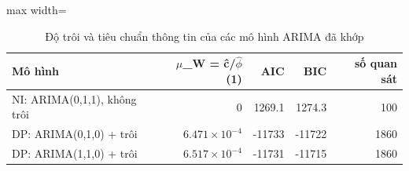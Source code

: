 \begin{table}[H]
\centering\small
\caption{Độ trôi và tiêu chuẩn thông tin của các mô hình ARIMA đã khớp}\label{tab:tab_b12_05_fit_stats}
\begin{adjustbox}{max width=\linewidth}
\begin{tabular}{lrrrr}
\toprule
Mô hình & $\hat{\mu}$\_W = ĉ/$\hat{\phi}$(1) & AIC & BIC & số quan sát \\
\midrule
NI: ARIMA(0,1,1), không trôi & 0 & 1269.1 & 1274.3 & 100 \\
DP: ARIMA(0,1,0) + trôi & $6.471\times10^{-4}$ & -11733 & -11722 & 1860 \\
DP: ARIMA(1,1,0) + trôi & $6.517\times10^{-4}$ & -11731 & -11715 & 1860 \\
\bottomrule
\end{tabular}
\end{adjustbox}\par{}
\end{table}
